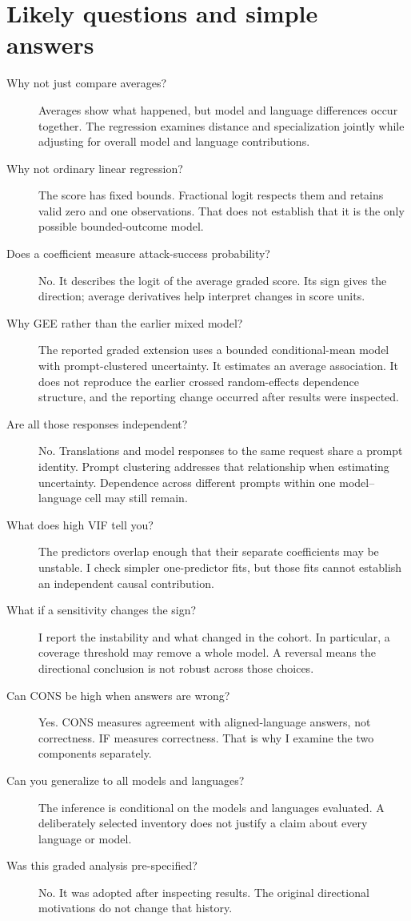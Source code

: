 \section*{Likely questions and simple answers}
\begin{description}
    \item[Why not just compare averages?] Averages show what happened, but model and language differences occur together. The regression examines distance and specialization jointly while adjusting for overall model and language contributions.
    \item[Why not ordinary linear regression?] The score has fixed bounds. Fractional logit respects them and retains valid zero and one observations. That does not establish that it is the only possible bounded-outcome model.
    \item[Does a coefficient measure attack-success probability?] No. It describes the logit of the average graded score. Its sign gives the direction; average derivatives help interpret changes in score units.
    \item[Why GEE rather than the earlier mixed model?] The reported graded extension uses a bounded conditional-mean model with prompt-clustered uncertainty. It estimates an average association. It does not reproduce the earlier crossed random-effects dependence structure, and the reporting change occurred after results were inspected.
    \item[Are all those responses independent?] No. Translations and model responses to the same request share a prompt identity. Prompt clustering addresses that relationship when estimating uncertainty. Dependence across different prompts within one model--language cell may still remain.
    \item[What does high VIF tell you?] The predictors overlap enough that their separate coefficients may be unstable. I check simpler one-predictor fits, but those fits cannot establish an independent causal contribution.
    \item[What if a sensitivity changes the sign?] I report the instability and what changed in the cohort. In particular, a coverage threshold may remove a whole model. A reversal means the directional conclusion is not robust across those choices.
    \item[Can CONS be high when answers are wrong?] Yes. CONS measures agreement with aligned-language answers, not correctness. IF measures correctness. That is why I examine the two components separately.
    \item[Can you generalize to all models and languages?] The inference is conditional on the models and languages evaluated. A deliberately selected inventory does not justify a claim about every language or model.
    \item[Was this graded analysis pre-specified?] No. It was adopted after inspecting results. The original directional motivations do not change that history.
\end{description}

